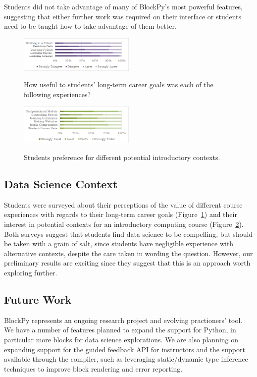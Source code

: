 \documentclass{sig-alternate}
\begin{document}
Students did not take advantage of many of BlockPy's most powerful features, suggesting that either further work was required on their interface or students need to be taught how to take advantage of them better.

\begin{figure}
\includegraphics[width=0.5\textwidth]{images/surveyUsefulness}
\label{fig-survey-usefulness}
\caption{How useful to students' long-term career goals was each of the following experiences?}
\end{figure}

\begin{figure}
\includegraphics[width=0.5\textwidth]{images/surveyContexts}
\label{fig-survey-context}
\caption{Students preference for different potential introductory contexts.}
\end{figure}

\subsection{Data Science Context}

Students were surveyed about their perceptions of the value of different course experiences with regards to their long-term career goals (Figure~\ref{fig-survey-usefulness}) and their interest in potential contexts for an introductory computing course (Figure~\ref{fig-survey-context}).
Both surveys suggest that students find data science to be compelling, but should be taken with a grain of salt, since students have negligible experience with alternative contexts, despite the care taken in wording the question.
However, our preliminary results are exciting since they suggest that this is an approach worth exploring further.

\subsection{Future Work}

BlockPy represents an ongoing research project and evolving practioners' tool.
We have a number of features planned to expand the support for Python, in particular more blocks for data science explorations.
We are also planning on expanding support for the guided feedback API for instructors and the support available through the compiler, such as leveraging static/dynamic type inference techniques to improve block rendering and error reporting.
\end{document}
